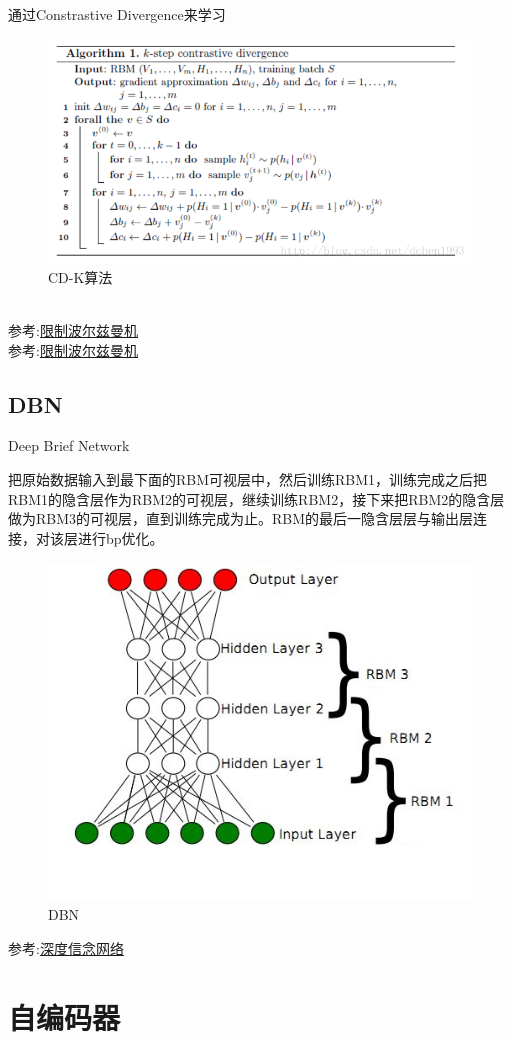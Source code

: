 \documentclass{article}
\begin{document}
通过Constrastive Divergence来学习\\
\begin{figure}[h]
\centering
\includegraphics[width=0.8\linewidth]{3.png}
\caption{CD-K算法}
\end{figure}\\
参考:\href{http://lib.csdn.net/article/deeplearning/59097?knId=1746}{限制波尔兹曼机}\\
参考:\href{http://deeplearning.net/tutorial/rbm.html#rbm}{限制波尔兹曼机}
\subsection{DBN}
Deep Brief Network

把原始数据输入到最下面的RBM可视层中，然后训练RBM1，训练完成之后把RBM1的隐含层作为RBM2的可视层，继续训练RBM2，接下来把RBM2的隐含层做为RBM3的可视层，直到训练完成为止。RBM的最后一隐含层层与输出层连接，对该层进行bp优化。
\begin{figure}[h]
\centering
\includegraphics[height=0.5\linewidth]{2.png}
\caption{DBN}
\end{figure}
参考:\href{}{深度信念网络}



\section{自编码器}
\end{document}

